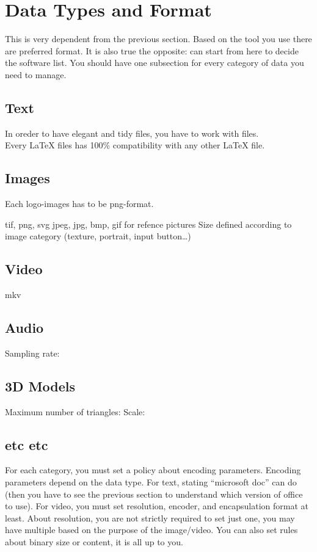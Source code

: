 \documentclass[12pt]{article}
\begin{document}
\section{Data Types and Format}
This is very dependent from the previous section. Based on the tool you use there are preferred format. It is also true the opposite: can start from here to decide the software list.
You should have one subsection for every category of data you need to manage. 

\subsection{Text}
In oreder to have elegant and tidy files, you have to work with \latex files.
\\Every LaTeX files has 100\% compatibility with any other LaTeX file.

\subsection{Images}
Each logo-images has to be png-format.

tif, png, svg
jpeg, jpg, bmp, gif for refence pictures
Size defined according to image category (texture, portrait, input button…)
\subsection{Video}
mkv
\subsection{Audio}
Sampling rate:
\subsection{3D Models}
Maximum number of triangles: 
Scale: 
\subsection{etc etc}

For each category, you must set a policy about encoding parameters.
Encoding parameters depend on the data type. For text, stating “microsoft doc” can do (then you have to see the previous section to understand which version of office to use). For video, you must set resolution, encoder, and encapsulation format at least. About resolution, you are not strictly required to set just one, you may have multiple based on the purpose of the image/video.
You can also set rules about binary size or content, it is all up to you.
\end{document}
